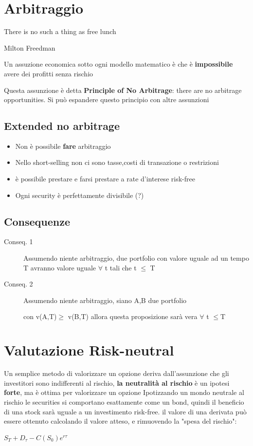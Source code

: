 \documentclass[a4paper,11pt]{report}
\begin{document}
{\newpage 

\section{Arbitraggio}
\epigraph{There is no such a thing as free lunch}{Milton Freedman } 
	Un assuzione economica sotto ogni modello matematico è che è \textbf{impossibile} avere dei profitti senza rischio \newline
	
	Questa assunzione è detta \textbf{Principle of No Arbitrage}: there are no arbitrage opportunities. \newline
	Si può espandere questo principio con altre assunzioni \newline
\subsection{Extended no arbitrage}
\begin{itemize}
	\item Non è possibile \textbf{fare} arbitraggio
	\item Nello short-selling non ci sono tasse,costi di transazione o restrizioni
	\item è possibile prestare e farsi prestare a rate d'interese risk-free
	\item Ogni security è perfettamente divisibile (?)
\end{itemize}
\subsection{Consequenze}
\begin{description}
	\item[Conseq. 1] Assumendo niente arbitraggio, due portfolio con valore uguale ad un tempo T avranno valore uguale 		$\forall$ t tali che t $\leq$ T
	\item[Conseq. 2] Assumendo niente arbitraggio, siano A,B due portfolio

	 con v(A,T)$\geq$ v(B,T) allora questa proposizione sarà vera $\forall$ t $\leq$T 
\end{description}

\section{Valutazione Risk-neutral}
	Un semplice metodo di valorizzare un opzione deriva dall'assunzione che gli investitori sono indifferenti al rischio, \newline
	\textbf{la neutralità al rischio} è un ipotesi \textbf{forte}, ma è ottima per valorizzare un opzione \newline
	Ipotizzando un mondo neutrale al rischio le securities si comportano esattamente come un bond, quindi il beneficio di una stock sarà uguale a un investimento risk-free.
	il valore di una derivata può essere ottenuto calcolando il valore atteso, e rimuovendo la "spesa del rischio":
\begin{center}
	$S_T + D_\tau - C(S_0)e^{r\tau}$
\end{center}
}
\end{document}
